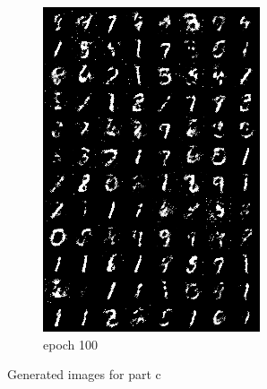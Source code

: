 \documentclass[a4paper]{article}
\theoremstyle{definition}
\newenvironment{soln}{
	\leavevmode\color{blue}\ignorespaces
}{}
\begin{document}
\begin{enumerate} [label=(\alph*)]
\begin{soln}
\begin{figure}[H]
\begin{subfigure}[b]{0.3\textwidth}
					\includegraphics[width=\textwidth]{outputs/c.gen_img100.png}
					\caption{epoch 100}
				\end{subfigure}
				\caption{Generated images for part c}
				\label{fig:three graphs}
			\end{figure}
		
		\end{soln}
		
	\end{enumerate}
\end{document}
